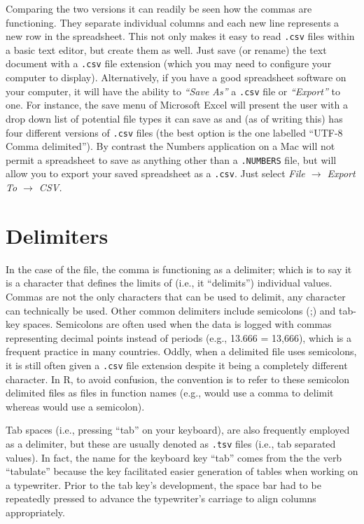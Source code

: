 Comparing the two versions it can readily be seen how the commas are functioning. They separate individual columns and each new line represents a new row in the spreadsheet. This not only makes it easy to read \texttt{.csv} files within a basic text editor, but create them as well. Just save (or rename) the text document with a \texttt{.csv} file extension (which you may need to configure your computer to display). Alternatively, if you have a good spreadsheet software on your computer, it will have the ability to \textit{``Save As''} a \texttt{.csv} file or \textit{``Export''} to one. For instance, the save menu of Microsoft Excel will present the user with a drop down list of potential file types it can save as and (as of writing this) has four different versions of \texttt{.csv} files (the best option is the one labelled ``UTF-8 Comma delimited''). By contrast the Numbers application on a Mac will not permit a spreadsheet to save as anything other than a \texttt{.NUMBERS} file, but will allow you to export your saved spreadsheet as a \texttt{.csv}. Just select \textit{File $\rightarrow$ Export To $\rightarrow$ CSV.}

\section{Delimiters}

In the case of the  file, the comma is functioning as a \gls{delimiter}; which is to say it is a character that defines the limits of (i.e., it ``delimits'') individual values. Commas are not the only characters that can be used to delimit, any character can technically be used. Other common delimiters include semicolons (;) and tab-key spaces. Semicolons are often used when the data is logged with commas representing decimal points instead of periods (e.g., 13.666 = 13,666), which is a frequent practice in many countries. Oddly, when a delimited file uses semicolons, it is still often given a \texttt{.csv} file extension despite it being a completely different character.  In R, to avoid confusion, the convention is to refer to these semicolon delimited files as  files in function names (e.g.,  would use a comma to delimit whereas  would use a semicolon).

Tab spaces (i.e., pressing ``tab'' on your keyboard), are also frequently employed as a delimiter, but these are usually denoted as \texttt{.tsv} files (i.e., tab separated values). In fact, the name for the keyboard key ``tab'' comes from the the verb ``tabulate'' because the key facilitated easier generation of tables when working on a typewriter. Prior to the tab key's development, the space bar had to be repeatedly pressed to advance the typewriter's carriage to align columns appropriately. 

